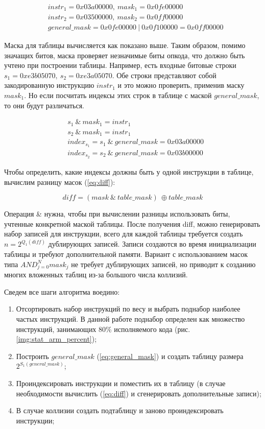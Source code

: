 \begin{align*}
		& instr_1 = 0x03a00000,\ mask_1=0x0fe00000 \\
		& instr_2 = 0x03500000,\ mask_2=0x0ff00000 \\
		& general\_mask = 0x0fe00000\ |\ 0x0f100000 = 0x0ff00000
\end{align*}


Маска для таблицы вычисляется как показано выше. Таким образом, помимо значащих битов, маска проверяет незначимые биты опкода, что должно быть учтено при построении таблицы. Например, есть входные битовые строки $s_1 = 0xe3b05070,\ s_2=0xe3a05070$. Обе строки представляют собой закодированную инструкцию $instr_1$ и это можно проверить, применив маску $mask_1$. Но если посчитать индексы этих строк в таблице с маской $general\_mask$, то они будут различаться.

\begin{align*}
	& s_1\ \&\ mask_1 = instr_1 \\
	& s_2\ \&\ mask_1 = instr_1 \\
	& index_{s_1} = s_1\ \&\ general\_mask = 0x03a00000 \\
	& index_{s_2} = s_2\ \&\ general\_mask = 0x03b00000
\end{align*}

Чтобы определить, какие индексы должны быть у одной инструкции в таблице, вычислим разницу масок (\ref{eq:diff}):

\begin{equation}\label{eq:diff}
	diff = (mask\ \&\ table\_mask)\ \oplus table\_mask
\end{equation}

Операция \& нужна, чтобы при вычислении разницы использовать биты, учтенные конкретной маской таблицы. После получения diff, можно генерировать набор записей для инструкции, всего для каждой таблицы требуется создать $n = 2^{Q_1(diff)}$ дублирующих записей. Записи создаются во время инициализации таблицы и требуют дополнительной памяти. Вариант с использованием масок типа $AND_{j=0}^{N}mask_j$ не требует дублирующих записей, но приводит к созданию многих вложенных таблиц из-за большого числа коллизий.

Сведем все шаги алгоритма воедино:

\begin{enumerate}
	\item Отсортировать набор инструкций по весу и выбрать поднабор наиболее частых инструкций. В данной работе поднабор определен как множество инструкций, занимающих 80\% исполняемого кода (рис. \ref{img:stat_arm_percent});
	\item Построить $general\_mask$ (\ref{eq:general_mask}) и создать таблицу размера $2^{S_1(general\_mask)}$;
	\item Проиндексировать инструкции и поместить их в таблицу (в случае необходимости вычислить (\ref{eq:diff}) и сгенерировать дополнительные записи);
	\item В случае коллизии создать подтаблицу и заново проиндексировать инструкции;
\end{enumerate}


